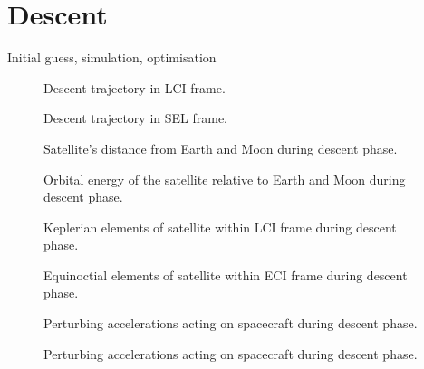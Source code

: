 \clearpage

\section{Descent}
Initial guess, simulation, optimisation

\begin{figure}
\centering
\def\svgwidth{\figurewidth}

\caption{Descent trajectory in LCI frame.}
\label{fig:Descent-3D-lci}
\end{figure}

\begin{figure}
\centering
\def\svgwidth{\figurewidth}

\caption{Descent trajectory in SEL frame.}
\label{fig:Descent-3D-sel}
\end{figure}

\begin{figure}
\centering
\def\svgwidth{\figurewidth}

\caption{Satellite's distance from Earth and Moon during descent phase.}
\label{fig:Descent-dist}
\end{figure}

\begin{figure}
\centering
\def\svgwidth{\figurewidth}

\caption{Orbital energy of the satellite relative to Earth and Moon during descent phase.}
\label{fig:Descent-orbeng}
\end{figure}

\begin{figure}
\centering
\def\svgwidth{\figurewidth}

\caption{Keplerian elements of satellite within LCI frame during descent phase.}
\label{fig:Descent-kep-lci}
\end{figure}

\begin{figure}
\centering
\def\svgwidth{\figurewidth}

\caption{Equinoctial elements of satellite within ECI frame during descent phase.}
\label{fig:Descent-mee}
\end{figure}

\begin{figure}
\centering
\def\svgwidth{\figurewidth}

\caption{Perturbing accelerations acting on spacecraft during descent phase.}
\label{fig:Descent-pert}
\end{figure}

\begin{figure}
\centering
\def\svgwidth{\figurewidth}

\caption{Perturbing accelerations acting on spacecraft during descent phase.}
\label{fig:Descent-pert2}
\end{figure}

